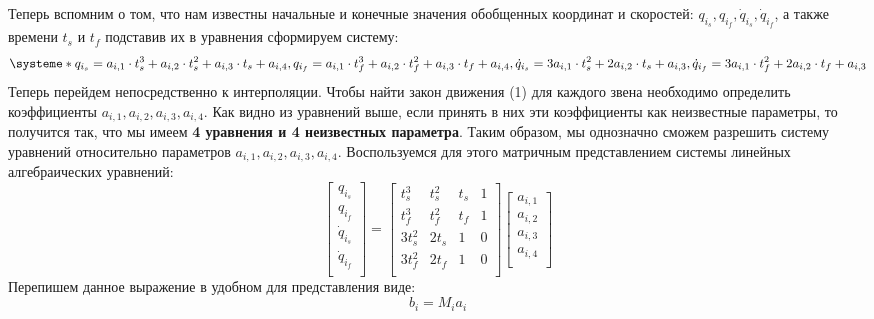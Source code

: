 Теперь вспомним о том, что нам известны начальные и конечные значения обобщенных координат и скоростей: $q_{i_{s}}, q_{i_{f}},\dot{q}_{i_{s}}, \dot{q}_{i_{f}}$, а также времени $t_s$ и $t_f$ подставив их в уравнения сформируем систему:
\begin{equation}\label{eq:model}
\systeme*{
q_{i_{s}}=a_{i,1}\cdot t_s^3  + a_{i,2}\cdot t_s^2 + a_{i,3}\cdot t_s + a_{i,4},
q_{i_{f}}=a_{i,1}\cdot t_f^3  + a_{i,2}\cdot t_f^2 + a_{i,3}\cdot t_f + a_{i,4},
\dot{q}_{i_{s}}=3a_{i,1}\cdot t_s^2  + 2a_{i,2}\cdot t_s + a_{i,3},
\dot{q}_{i_{f}}=3a_{i,1}\cdot t_f^2  + 2a_{i,2}\cdot t_f + a_{i,3}
}
\end{equation}
Теперь перейдем непосредственно к интерполяции. Чтобы найти закон движения (1) для каждого звена необходимо определить коэффициенты $a_{i,1}, a_{i,2}, a_{i,3}, a_{i,4}$. Как видно из уравнений выше, если принять в них эти коэффициенты как неизвестные параметры, то получится так, что мы имеем \textbf{4 уравнения и 4 неизвестных параметра}.
Таким образом, мы однозначно сможем разрешить систему уравнений относительно параметров $a_{i,1}, a_{i,2}, a_{i,3}, a_{i,4}$.
Воспользуемся для этого матричным представлением системы линейных алгебраических уравнений:
\begin{equation}\label{eq:model}
     \begin{bmatrix}
    q_{i_{s}} \\
    q_{i_{f}} \\
    \dot{q}_{i_{s}} \\
    \dot{q}_{i_{f}} \\
    \end{bmatrix}
    =
    \begin{bmatrix}
    t^3_s & t^2_s & t_s & 1\\
    t^3_f & t^2_f & t_f & 1\\
    3t^2_s & 2t_s & 1 & 0\\
    3t^2_f & 2t_f & 1 & 0\\
    \end{bmatrix}
    \begin{bmatrix}
    a_{i,1}\\
    a_{i,2}\\
    a_{i,3}\\
    a_{i,4}\\
    \end{bmatrix}
\end{equation}
Перепишем данное выражение в удобном для представления виде:
\begin{equation}\label{eq:model}
b_i = M_i a_i
\end{equation}
